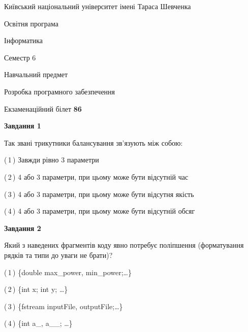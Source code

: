 \documentclass[10pt, ukrainian]{article}
\begin{document}
{{\begin {small}\par
{ \center  Київський національний університет імені Тараса Шевченка \par}
{\parbox {5 cm}{Освітня програма \hfill}{\parbox {7 cm}{Інформатика \hfill}}\parbox {6 cm}{\hfill Семестр 6}}\par
{\parbox {5 cm} {Навчальний предмет \hfill}\parbox {7 cm}{Розробка програмного забезпечення \hfill}\parbox {6cm}{\hfill}\par}\vspace{-7pt} \end{small}}{\center Екзаменаційний білет \No \textbf
{ 86 }\par}}
{
\begin {large}
{\begin {center}\textbf{Завдання 1}\end {center}}\par
Так звані трикутники балансування зв'язують між собою:\par
\vspace{2mm}



(\,1\,) Завжди рівно 3 параметри%



(\,2\,) 4 або 3 параметри, при цьому може бути відсутній час%



(\,3\,) 4 або 3 параметри, при цьому може бути відсутня якість%



(\,4\,) 4 або 3 параметри, при цьому може бути відсутній обсяг %


{\begin {center}\textbf{Завдання 2}\end {center}}\par
Який з наведених фрагментів коду явно потребує поліпшення (форматування рядків та типи до уваги не брати)?\par
\vspace{2mm}



(\,1\,) \{double max\_power, min\_power;…\} %



(\,2\,) \{int x; int y; …\}%



(\,3\,) \{fstream inputFile, outputFile;…\} %



(\,4\,) \{int a\_, a\_\_; …\}%



\end{large}}
\end{document}
